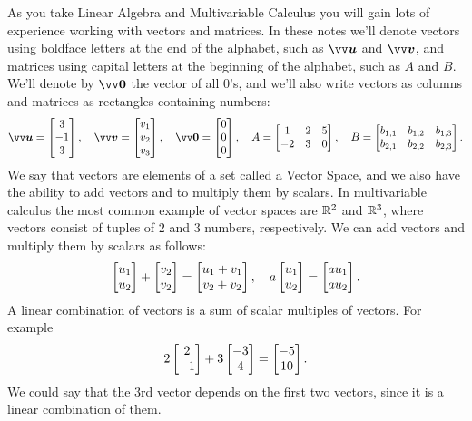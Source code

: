 \documentclass[twoside]{article}
\begin{document}
As you take Linear Algebra and Multivariable Calculus you will gain lots of experience working with vectors and matrices.
In these notes we'll denote vectors using boldface letters at the end of the alphabet, such as $\bv{u}$ and $\bv{v}$, and matrices using capital letters at the beginning of the alphabet, such as $A$ and $B$.
We'll denote by $\bv{0}$ the vector of all $0$'s, and we'll also write vectors as columns and matrices as rectangles containing numbers:
\begin{equation*}
  \bv{u} = \mat{3\\-1\\3}, \quad \bv{v} = \mat{v_1\\v_2\\v_3}, \quad \bv{0} = \mat{0\\0\\0}, \quad A = \mat{1 & 2 & 5\\-2 & 3 & 0}, \quad B = \mat{b_{1,1} & b_{1, 2} & b_{1, 3}\\b_{2, 1} & b_{2, 2} & b_{2, 3}}.
\end{equation*}
We say that vectors are elements of a set called a Vector Space, and we also have the ability to add vectors and to multiply them by scalars.
In multivariable calculus the most common example of vector spaces are $\mathbb{R}^2$ and $\mathbb{R}^3$, where vectors consist of tuples of $2$ and $3$ numbers, respectively.
We can add vectors and multiply them by scalars as follows:
\begin{equation*}
  \begin{bmatrix}u_1\\u_2\end{bmatrix} + \begin{bmatrix}v_2\\v_2\end{bmatrix} = \begin{bmatrix}u_1 + v_1\\v_2 + v_2\end{bmatrix}, \quad a\begin{bmatrix}u_1\\u_2\end{bmatrix} = \begin{bmatrix}a u_1\\ a u_2\end{bmatrix}.
\end{equation*}
A linear combination of vectors is a sum of scalar multiples of vectors.
For example
\begin{equation*}
  2\begin{bmatrix}2\\-1\end{bmatrix} + 3\begin{bmatrix}-3\\4\end{bmatrix} = \begin{bmatrix}-5\\10\end{bmatrix}.
\end{equation*}
We could say that the $3$rd vector depends on the first two vectors, since it is a linear combination of them.
\end{document}
